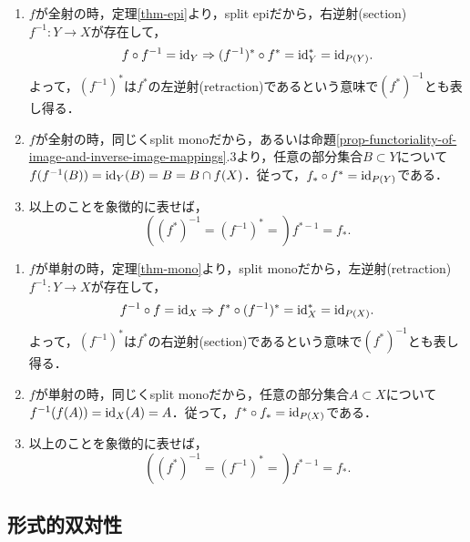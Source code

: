 \documentclass[uplatex,dvipdfmx]{jsreport}
\begin{document}
\begin{proposition}[全射の双対写像]\label{prop-dual-of-epi}\mbox{}
    \begin{enumerate}
        \item $f$が全射の時，定理\ref{thm-epi}より，split epiだから，右逆射(section) $f^{-1}:Y\to X$が存在して，\[f\circ f^{-1}=\mathrm{id}_Y\Rightarrow (f^{-1})^*\circ f^*=\mathrm{id}^*_Y=\mathrm{id}_{P(Y)}.\]よって，$(f^{-1})^*$は$f^*$の左逆射(retraction)であるという意味で$(f^*)^{-1}$とも表し得る．
        \item $f$が全射の時，同じくsplit monoだから，あるいは命題\ref{prop-functoriality-of-image-and-inverse-image-mappings}.3より，任意の部分集合$B\subset Y$について$f(f^{-1}(B))=\mathrm{id}_Y(B)=B=B\cap f(X)$．従って，$f_*\circ f^*=\mathrm{id}_{P(Y)}$である．
        \item 以上のことを象徴的に表せば，\[((f^*)^{-1}=(f^{-1})^*=)f^{*-1}=f_*.\]
    \end{enumerate}
\end{proposition}

\begin{proposition}[単射の双対写像]\label{prop-dual-of-mono}\mbox{}
    \begin{enumerate}
        \item $f$が単射の時，定理\ref{thm-mono}より，split monoだから，左逆射(retraction) $f^{-1}:Y\to X$が存在して，\[f^{-1}\circ f=\mathrm{id}_X\Rightarrow f^*\circ (f^{-1})^*=\mathrm{id}^*_X=\mathrm{id}_{P(X)}.\]よって，$(f^{-1})^*$は$f^*$の右逆射(section)であるという意味で$(f^*)^{-1}$とも表し得る．
        \item $f$が単射の時，同じくsplit monoだから，任意の部分集合$A\subset X$について$f^{-1}(f(A))=\mathrm{id}_X(A)=A$．従って，$f^*\circ f_*=\mathrm{id}_{P(X)}$である．
        \item 以上のことを象徴的に表せば，\[((f^*)^{-1}=(f^{-1})^*=)f^{*-1}=f_*.\]
    \end{enumerate}
\end{proposition}


\subsection{形式的双対性}
\end{document}
